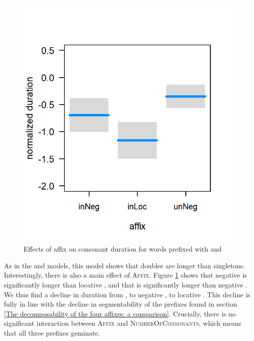 \begin{figure} [b!]
	\vspace*{-0.5cm}
	\centering
	\includegraphics[scale=0.8] {images/Corpus/unInModel.png}
	\caption{Effects of  affix on consonant duration for words prefixed with  and }
	\label{fig:inUnModel}
\end{figure}



As in the  and models, this model shows that doubles are longer than singletons. Interestingly, there is also  a  main effect of \textsc{Affix}. Figure \ref{fig:inUnModel} shows that negative  is significantly longer than locative , and that  is significantly longer than negative .  We thus find a decline in duration from , to negative , to locative . This decline is fully in line with the decline in segmentability of the prefixes found in section \ref{The decomposability of the four affixes: a comparison}. Crucially, there is no significant interaction between \textsc{Affix} and \textsc{NumberOfConsonants}, which means that all three prefixes geminate.


